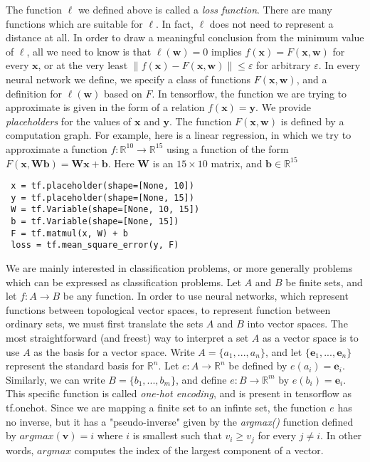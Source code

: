 \documentclass[10pt]{amsart}
\newcommand{\R}{\mathbb{R}}
\renewcommand{\v}{\mathbf{v}}
\newcommand{\w}{\mathbf{w}}
\newcommand{\x}{\mathbf{x}}
\newcommand{\y}{\mathbf{y}}
\renewcommand{\b}{\mathbf{b}}
\newcommand{\e}{\mathbf{e}}
\newcommand{\W}{\mathbf{W}}
\theoremstyle{definition}
\begin{document}
 The function $\ell$ we defined above is called a {\em loss function}.  There are many functions which are suitable for $\ell$.  In fact, $\ell$ does not need to represent a distance at all. In order to draw a meaningful conclusion from the minimum value of $\ell$, all we need to know is that $\ell(\w)=0$ implies $f(\x)=F(\x,\w)$ for every $\x$, or at the very least $\|f(\x)-F(\x,\w)\|\leq\varepsilon$ for arbitrary $\varepsilon$.  In every neural network we define, we specify a class of functions $F(\x, \w)$, and a definition for $\ell(\w)$ based on $F$. In tensorflow, the function we are trying to approximate is given in the form of a relation $f(\x)=\y$. We provide {\em placeholders} for the values of $\x$ and $\y$.  The function $F(\x,\w)$ is defined by a computation graph.  For example, here is a linear regression, in which we try to approximate a function $f:\R^{10}\to\R^{15}$ using a function of the form $F(\x, \W\b)=\W\x+\b$. Here $\W$ is an $15\times 10$ matrix, and $\b\in\R^{15}$

 \begin{verbatim}
 x = tf.placeholder(shape=[None, 10])
 y = tf.placeholder(shape=[None, 15])
 W = tf.Variable(shape=[None, 10, 15])
 b = tf.Variable(shape=[None, 15])
 F = tf.matmul(x, W) + b
 loss = tf.mean_square_error(y, F)
 \end{verbatim}


We are mainly interested in classification problems, or more generally problems which can be expressed as classification problems. Let $A$ and $B$ be finite sets, and let $f:A\to B$ be any function.  In order to use neural networks, which represent functions between topological vector spaces, to represent  function between ordinary sets, we must first translate the sets $A$ and $B$ into vector spaces.  The most straightforward (and freest) way to interpret a set $A$ as a vector space is to use $A$ as the basis for a vector space.  Write $A=\{a_1,...,a_n\}$, and let $\{\e_1,...,\e_n\}$ represent the standard basis for $\R^n$.  Let $e:A\to\R^n$ be defined by $e(a_i)=\e_i$.  Similarly, we can write $B=\{b_1,...,b_m\}$, and define $e:B\to \R^m$ by $e(b_i)=\e_i$.  This specific function is called {\em one-hot encoding}, and is present in tensorflow as tf.onehot.  Since we are mapping a finite set to an infinte set, the function $e$ has no inverse, but it has a "pseudo-inverse" given by the {\em argmax()} function defined by $argmax(\v)=i$ where $i$ is smallest such that $v_i\geq v_j$ for every $j\not=i$. In other words, $argmax$ computes the index of the largest component of a vector.
\end{document}
